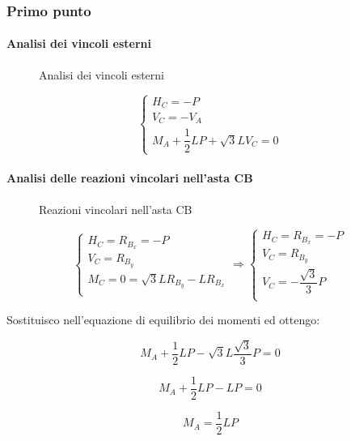 \documentclass[main.tex]{subfiles}
\begin{document}
\subsubsection{Primo punto}

\paragraph{Analisi dei vincoli esterni}

\begin{figure}[H]
\centering
\resizebox{.5\textwidth}{!}{}
\caption{Analisi dei vincoli esterni}
\end{figure}

\[
\begin{cases}
	H_C = -P\\
	V_C = -V_A\\
	M_A + \dfrac{1}{2}LP + \sqrt{3}LV_C = 0
\end{cases}
\]

\paragraph{Analisi delle reazioni vincolari nell'asta CB}

\begin{figure}[H]
\centering
\resizebox{.5\textwidth}{!}{}
\caption{Reazioni vincolari nell'asta CB}
\end{figure}

\[
\begin{cases}
	H_C = R_{B_x} = -P\\
	V_C = R_{B_y}\\
	M_C = 0 = \sqrt{3}LR_{B_y} - LR_{B_x}\\
\end{cases}
\Longrightarrow
\begin{cases}
	H_C = R_{B_x} = -P\\
	V_C = R_{B_y}\\
	V_C = -\dfrac{\sqrt{3}}{3}P\\
\end{cases}
\]

Sostituisco nell'equazione di equilibrio dei momenti ed ottengo:

\[
	M_A + \dfrac{1}{2}LP - \sqrt{3}L\dfrac{\sqrt{3}}{3}P = 0
\]

\[
	M_A + \dfrac{1}{2}LP - LP = 0
\]

\[
	M_A  = \dfrac{1}{2}LP
\]
\end{document}
